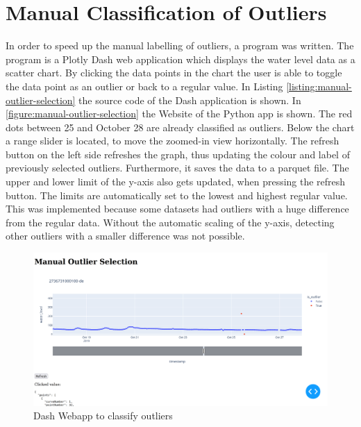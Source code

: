\section{Manual Classification of Outliers}
In order to speed up the manual labelling of outliers, a program was written. The program is a Plotly Dash \cite{DashDocumentationUser} web application which displays the water level data as a scatter chart. 
By clicking the data points in the chart the user is able to toggle the data point as an outlier or back to a regular value. 
In Listing \autoref{listing:manual-outlier-selection} the source code of the Dash application is shown. 
In \autoref{figure:manual-outlier-selection} the Website of the Python app is shown. The red dots between 25 and October 28 are already classified as outliers. Below the chart a range slider is located, to move the zoomed-in view horizontally. 
The refresh button on the left side refreshes the graph, thus updating the colour and label of previously selected outliers. Furthermore, it saves the data to a parquet file.
The upper and lower limit of the y-axis also gets updated, when pressing the refresh button. 
The limits are automatically set to the lowest and highest regular value. 
This was implemented because some datasets had outliers with a huge difference from the regular data. 
Without the automatic scaling of the y-axis, detecting other outliers with a smaller difference was not possible.
\begin{figure}[H]
    \centering
    \includegraphics[width=\textwidth]{./pics/manual-outlier-selection.png}
    \caption{Dash Webapp to classify outliers}
    \label{figure:manual-outlier-selection}
\end{figure}

